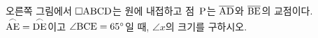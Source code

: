 \noindent\begin{minipage}[t]{0.58\linewidth}\vspace{0pt}\raggedright 오른쪽 그림에서 $\square\mathrm{ABCD}$는 원에 내접하고 점~$\mathrm{P}$는 $\overline{\mathrm{AD}}$와 $\overline{\mathrm{BE}}$의 교점이다. $\overset{\frown}{\mathrm{AE}}=\overset{\frown}{\mathrm{DE}}$이고 $\angle\mathrm{BCE}=65^\circ$일 때, $\angle x$의 크기를 구하시오.\end{minipage}\hfill\begin{minipage}[t]{0.4\linewidth}\vspace{0pt}\centering \resizebox{\ifdim\width>\linewidth\linewidth\else\width\fi}{!}{}\end{minipage}\par
